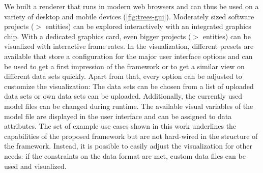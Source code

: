 \documentclass[a4paper,twoside]{article}
\begin{document}
\noindent 
We built a renderer that runs in modern web browsers and can thus be used on a variety of desktop and mobile devices (\autoref{fig:trees-gui}).
Moderately sized software projects ($>$ entities) can be explored interactively with an integrated graphics chip. 
With a dedicated graphics card, even bigger projects ($>$ entities) can be visualized with interactive frame rates. 
In the visualization, different presets are available that store a configuration for the major user interface options and can be used to get a first impression of the framework or to get a similar view on different data sets quickly. 
Apart from that, every option can be adjusted to customize the visualization: 
The data sets can be chosen from a list of uploaded data sets or own data sets can be uploaded.
Additionally, the currently used model files can be changed during runtime.
The available visual variables of the model file are displayed in the user interface and can be assigned to data attributes.
The set of example use cases shown in this work underlines the capabilities of the proposed framework but are not hard-wired in the structure of the framework. 
Instead, it is possible to easily adjust the visualization for other needs: if the constraints on the data format are met, custom data files can be used and visualized.
\end{document}
